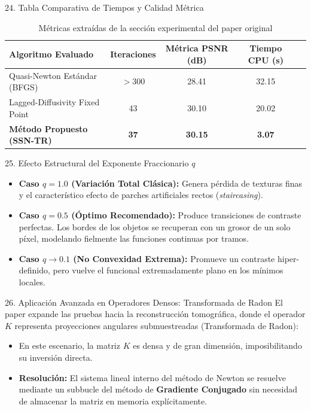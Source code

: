 \documentclass[aspectratio=169,11pt]{beamer}
\begin{document}
\begin{frame}{24. Tabla Comparativa de Tiempos y Calidad Métrica}
    \begin{table}
        \centering
        \caption{Métricas extraídas de la sección experimental del paper original}
        \begin{tabular}{lcccc}
            \toprule
            \textbf{Algoritmo Evaluado} & \textbf{Iteraciones} & \textbf{Métrica PSNR (dB)} & \textbf{Tiempo CPU (s)} \\
            \midrule
            Quasi-Newton Estándar (BFGS) & $>300$ & 28.41 & 32.15 \\
            Lagged-Diffusivity Fixed Point & 43 & 30.10 & 20.02 \\
            \textbf{Método Propuesto (SSN-TR)} & \textbf{37} & \textbf{30.15} & \textbf{3.07} \\
            \bottomrule
        \end{tabular}
    \end{table}
\end{frame}

\begin{frame}{25. Efecto Estructural del Exponente Fraccionario $q$}
    \begin{itemize}
        \item \textbf{Caso $q = 1.0$ (Variación Total Clásica):} Genera pérdida de texturas finas y el característico efecto de parches artificiales rectos (\textit{staircasing}).
        \item \textbf{Caso $q = 0.5$ (Óptimo Recomendado):} Produce transiciones de contraste perfectas. Los bordes de los objetos se recuperan con un grosor de un solo píxel, modelando fielmente las funciones continuas por tramos.
        \item \textbf{Caso $q \to 0.1$ (No Convexidad Extrema):} Promueve un contraste hiper-definido, pero vuelve el funcional extremadamente plano en los mínimos locales.
    \end{itemize}
\end{frame}

\begin{frame}{26. Aplicación Avanzada en Operadores Densos: Transformada de Radon}
    El paper expande las pruebas hacia la reconstrucción tomográfica, donde el operador $K$ representa proyecciones angulares submuestreadas (Transformada de Radon):
    \begin{itemize}
        \item En este escenario, la matriz $K$ es densa y de gran dimensión, imposibilitando su inversión directa.
        \item \textbf{Resolución:} El sistema lineal interno del método de Newton se resuelve mediante un subbucle del método de \textbf{Gradiente Conjugado} sin necesidad de almacenar la matriz en memoria explícitamente.
    \end{itemize}
\end{frame}
\end{document}
